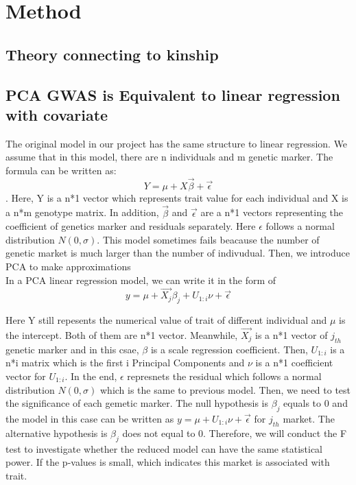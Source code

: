 \documentclass[12pt]{article}
\begin{document}
\section{Method} 
\subsection{Theory connecting to kinship}

\subsection{PCA GWAS  is Equivalent to linear regression with covariate}
The original model in our project has the same structure to linear regression. We assume that in this model, there are n individuals and m genetic marker. The formula can be written as: $$Y=\mu+X \vec{\beta}+\vec{\epsilon}$$. Here, Y is a n*1 vector which represents trait value for each individual and X is a n*m genotype matrix. In addition, $\vec{\beta}$ and $\vec{\epsilon}$ are a n*1 vectors representing the coefficient of genetics marker and residuals separately. Here $\epsilon$ follows a normal distribution $N(0,\sigma)$. This model sometimes fails beacause the number of genetic market is much larger than the number of indivudual. Then, we introduce PCA to make approximations\\

In a PCA linear regression model, we can write it in the form of $$y=\mu+ \vec{X_{j}} {\beta}_{j}+U_{1:i} \nu+\vec{\epsilon}$$

Here Y still repesents the numerical value of trait of different individual and $\mu$ is the intercept. Both of them are n*1 vector. Meanwhile, $\vec{X_{j}}$ is a n*1 vector of $j_{th}$ genetic marker and in this csae, $\beta$ is a scale regression coefficient. Then, $U_{1:i}$ is a n*i matrix which is the first i Principal Components and $\nu$ is a n*1 coefficient vector for $U_{1:i}$. In the end, $\epsilon$ represnets the residual which follows a normal distribution $N(0,\sigma)$ which is the same to previous model. Then, we need to test the significance of each gemetic marker. The null hypothesis is ${\beta}_{j}$ equals to 0 and the model in this case can be written as $y=\mu+U_{1:i} \nu+\vec{\epsilon}$ for $j_{th}$ market. The alternative hypothesis is ${\beta}_{j}$ does not equal to 0. Therefore, we will conduct the F test to investigate whether the reduced model can have the same statistical power. If the p-values is small, which indicates this market is associated with trait.\\
\end{document}
